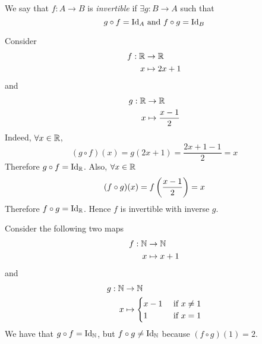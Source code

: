 \documentclass{article}
\begin{document}
\begin{defi}[Invertible]
    We say that $f: A \rightarrow B$ is \emph{invertible} if $\exists g: B \rightarrow A$ such that
    \[
        g \circ f = \mathrm{Id}_A \text{ and } f \circ g = \mathrm{Id}_B
    \]
\end{defi}
\begin{eg}
    Consider
    \begin{align*}
        f : \mathbb{R} &\rightarrow \mathbb{R} \\
        x &\mapsto 2x + 1
    \end{align*}
    and
    \begin{align*}
        g : \mathbb{R} &\rightarrow \mathbb{R} \\
        x &\mapsto \frac{x - 1}{2}
    \end{align*}
    Indeed, $\forall x \in \mathbb{R}$, 
    \[
        (g \circ f)(x) = g(2x + 1) = \frac{2x + 1 - 1}{2} = x  
    \]
    Therefore $g \circ f = \mathrm{Id}_{\mathbb{R}}$.
    Also, $\forall x \in \mathbb{R}$
    \[
        (f \circ g)(x) = f \left( \frac{x-1}{2} \right) = x  
    \]
    Therefore $f \circ g = \mathrm{Id}_{\mathbb{R}}$.
    Hence $f$ is invertible with inverse $g$.
\end{eg}

\begin{warning}
    Consider the following two maps
    \begin{align*}
        f : \mathbb{N} &\rightarrow \mathbb{N} \\
        x &\mapsto x + 1
    \end{align*}
    and
    \begin{align*}
        g : \mathbb{N} &\rightarrow \mathbb{N} \\
        x &\mapsto \begin{cases}
            x - 1 & \text{ if } x \neq 1 \\
            1 & \text{ if } x = 1
        \end{cases}
    \end{align*}
    We have that $g \circ f = \mathrm{Id}_{\mathbb{N}}$, but $f \circ g \neq \mathrm{Id}_{\mathbb{N}}$ because $(f \circ g)(1) = 2$.
\end{warning}
\end{document}
